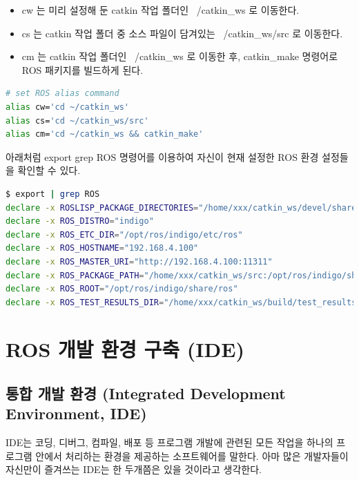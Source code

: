\begin{itemize}
\item cw 는 미리 설정해 둔 catkin 작업 폴더인 ~/catkin\_ws 로 이동한다. 
\item cs 는 catkin 작업 폴더 중 소스 파일이 담겨있는 ~/catkin\_ws/src 로 이동한다. 
\item cm 는 catkin 작업 폴더인 ~/catkin\_ws 로 이동한 후, catkin\_make 명령어로 ROS 패키지를 빌드하게 된다.
\end{itemize}

\begin{lstlisting}[language=bash]
# set ROS alias command
alias cw='cd ~/catkin_ws'
alias cs='cd ~/catkin_ws/src'
alias cm='cd ~/catkin_ws && catkin_make'
\end{lstlisting}

\begin{exercise}[ROS 환경 설정 확인 방법]
아래처럼 export \textbar grep ROS 명령어를 이용하여 자신이 현재 설정한 ROS 환경 설정들을 확인할 수 있다.
\begin{lstlisting}[language=bash, backgroundcolor=\color{ocre!10}, numbers=none]
$ export | grep ROS
declare -x ROSLISP_PACKAGE_DIRECTORIES="/home/xxx/catkin_ws/devel/share/common-lisp"
declare -x ROS_DISTRO="indigo"
declare -x ROS_ETC_DIR="/opt/ros/indigo/etc/ros"
declare -x ROS_HOSTNAME="192.168.4.100"
declare -x ROS_MASTER_URI="http://192.168.4.100:11311"
declare -x ROS_PACKAGE_PATH="/home/xxx/catkin_ws/src:/opt/ros/indigo/share:/opt/ros/indigo/stacks"
declare -x ROS_ROOT="/opt/ros/indigo/share/ros"
declare -x ROS_TEST_RESULTS_DIR="/home/xxx/catkin_ws/build/test_results"
\end{lstlisting}
\end{exercise}

\section{ROS 개발 환경 구축 (IDE)}

\subsection{통합 개발 환경 (Integrated Development Environment, IDE)}

IDE는 코딩, 디버그, 컴파일, 배포 등 프로그램 개발에 관련된 모든 작업을 하나의 프로그램 안에서 처리하는 환경을 제공하는 소프트웨어를 말한다. 아마 많은 개발자들이 자신만이 즐겨쓰는 IDE는 한 두개쯤은 있을 것이라고 생각한다. 

